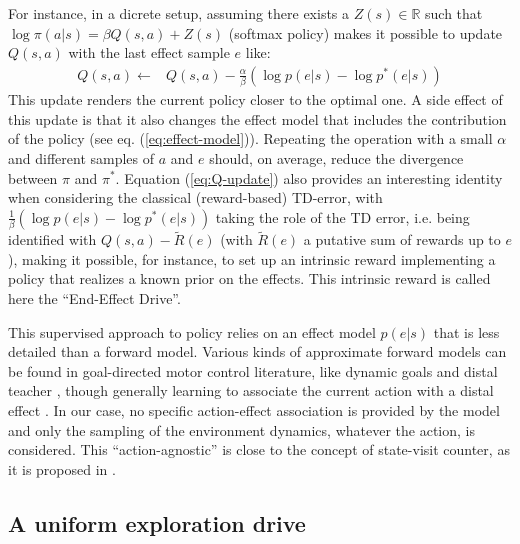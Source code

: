 \documentclass[runningheads]{llncs}
\begin{document}
For instance, in a dicrete setup, assuming there exists a $Z(s) \in \mathbb{R}$ such that $\log \pi(a|s) = \beta Q(s,a) + Z(s)$ (softmax policy) makes it possible to update $Q(s,a)$ with the last effect sample $e$ like:
\begin{align}\label{eq:Q-update}
Q(s,a) \leftarrow & Q(s,a) - \frac{\alpha}{\beta} (\log p(e|s) - \log p^*(e|s))
\end{align}  
This update renders the current policy closer to the optimal one. A side effect of this update is that it also changes the effect model that includes the contribution of the policy (see eq. (\ref{eq:effect-model})). Repeating the operation with a small $\alpha$ and different samples of $a$ and $e$ should, on average, reduce the divergence between $\pi$ and $\pi^*$.
Equation (\ref{eq:Q-update}) also provides an interesting identity when considering the classical (reward-based) TD-error, with $\frac{1}{\beta} (\log p(e|s) - \log p^*(e|s))$ taking the role of the TD error, i.e. being identified with $Q(s,a)- \tilde{R}(e)$ (with $\tilde{R}(e)$ a putative sum of rewards up to $e$),
making it possible, for instance, to set up an intrinsic reward implementing a policy that realizes a known prior on the effects. 
This intrinsic reward is called here the ``End-Effect Drive''.

This supervised approach to policy relies on an effect model $p(e|s)$ that is less detailed than a forward model. Various kinds of approximate forward models can be found in goal-directed motor control literature, like dynamic goals \cite{kaelbling1993learning} and distal teacher \cite{jordan1992forward}, though generally learning to associate the current action with a distal effect \cite{mishra2017prediction,kurutach2018model}. In our case, no specific action-effect association is provided by the model and only the sampling of the environment dynamics, whatever the action, is considered. This ``action-agnostic'' is close to the concept of state-visit counter, as it is proposed in \cite{bellemare2016unifying}.



\subsection{A uniform exploration drive}
\end{document}
